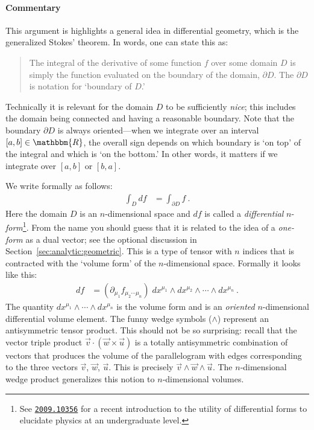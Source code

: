 \paragraph{Commentary}
This argument is highlights a general idea in differential geometry, which is the generalized Stokes' theorem. In words, one can state this as:
\begin{quote}
The integral of the derivative of some function $f$ over some domain $D$ is simply the function evaluated on the boundary of the domain, $\partial D$. The $\partial D$ is notation for `boundary of $D$.'
\end{quote}
Technically it is relevant for the domain $D$ to be sufficiently \emph{nice}; this includes the domain being connected and having a reasonable boundary. Note that the boundary $\partial D$ is always oriented---when we integrate over an interval $[a,b]\in \mathbbm{R}$, the overall sign depends on which boundary is `on top' of the integral and which is `on the bottom.' In other words, it matters if we integrate over $[a,b]$ or $[b,a]$. 

We write formally as follows:
\begin{align}
	\int_D df &= \int_{\partial D} f \ .
\end{align}
Here the domain $D$ is an $n$-dimensional space and $df$ is called a \emph{differential} $n$-\emph{form}\footnote{See \texttt{\href{https://arxiv.org/abs/2009.10356}{2009.10356}} for a recent introduction to the utility of differential forms to elucidate physics at an undergraduate level.}. From the name you should guess that it is related to the idea of a \emph{one-form} as a dual vector; see the optional discussion in Section~\ref{sec:analytic:geometric}.  This is a type of tensor with $n$ indices that is contracted with the `volume form' of the $n$-dimensional space. Formally it looks like this:
\begin{align}
	df &= (\partial_{\mu_1} f_{\mu_2\cdots \mu_n}) \; dx^{\mu_1}\wedge dx^{\mu_2}\wedge\cdots\wedge dx^{\mu_n} \ .
	\label{eq:Stokes}
\end{align}
The quantity $dx^{\mu_1}\wedge\cdots\wedge dx^{\mu_n}$ is the volume form and is an \emph{oriented} $n$-dimensional differential volume element. The funny wedge symbols ($\wedge$) represent an antisymmetric tensor product. This should not be so surprising: recall that the vector triple product $\vec{v}\cdot\left(\vec{w}\times\vec{u}\right)$ is a totally antisymmetric combination of vectors that produces the volume of the parallelogram with edges corresponding to the three vectors $\vec{v}$, $\vec{w}$, $\vec{u}$. This is precisely $\vec{v}\wedge\vec{w}\wedge\vec{u}$. The $n$-dimensional wedge product generalizes this notion to $n$-dimensional volumes. 

